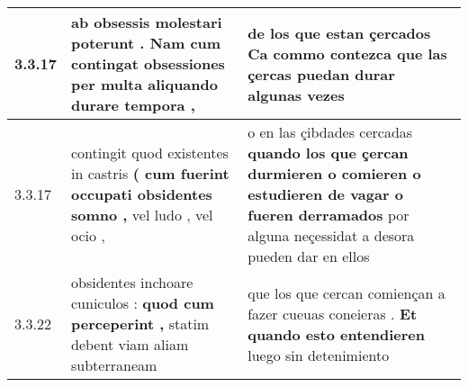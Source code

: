 \begin{tabular}{|p{1cm}|p{6.5cm}|p{6.5cm}|}
3.3.17 & ab obsessis molestari poterunt . \textbf{ Nam cum contingat obsessiones } per multa aliquando durare tempora , & de los que estan çercados \textbf{ Ca commo contezca } que las çercas puedan durar algunas vezes \\\hline
3.3.17 & contingit quod existentes in castris \textbf{ ( cum fuerint occupati obsidentes somno , } vel ludo , vel ocio , & o en las çibdades cercadas \textbf{ quando los que çercan durmieren o comieren o estudieren de vagar o fueren derramados } por alguna neçessidat a desora pueden dar en ellos \\\hline
3.3.22 & obsidentes inchoare cuniculos : \textbf{ quod cum perceperint , } statim debent viam aliam subterraneam & que los que cercan comiençan a fazer cueuas coneieras . \textbf{ Et quando esto entendieren } luego sin detenimiento \\\hline

\end{tabular}
